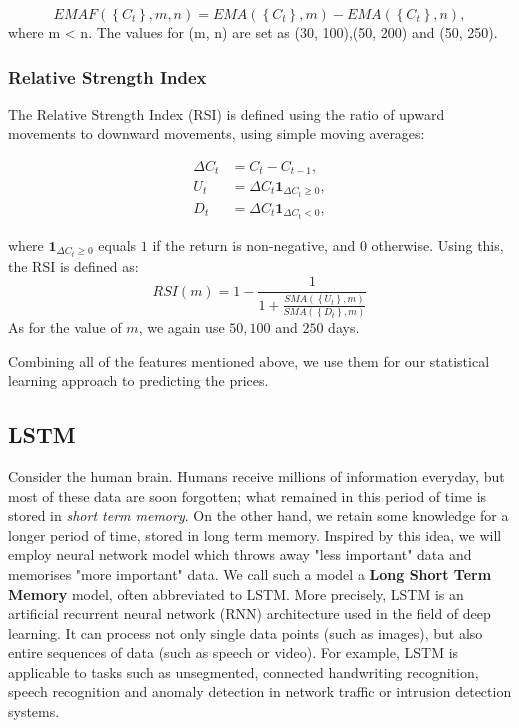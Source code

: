 \documentclass[twoside]{report}
\begin{document}
\begin{spacing}{1}
\[
E M A F\left(\left\{C_{t}\right\}, m, n\right)=E M A\left(\left\{C_{t}\right\}, m\right)-E M A\left(\left\{C_{t}\right\}, n\right),
\]
where m < n. The values for (m, n) are set as (30, 100),(50, 200) and (50, 250).


\subsubsection{Relative Strength Index}
The Relative Strength Index (RSI) is defined using the ratio of upward movements to downward movements, using simple moving averages:

\[
\begin{aligned}
\Delta C_{t} &=C_{t}-C_{t-1}, \\
U_{t} &=\Delta C_{t} \mathbf{1}_{\Delta C_{t} \geq 0}, \\
D_{t} &=\Delta C_{t} \mathbf{1}_{\Delta C_{t}<0},
\end{aligned}
\]

where $\mathbf{1}_{\Delta C_{t} \geq 0}$ equals $1$ if the return is non-negative, and $0$ otherwise. Using this, the RSI is defined as:
\[
R S I(m)=1-\frac{1}{1+\frac{S M A\left(\left\{U_{t}\right\}, m\right)}{S M A\left(\left\{D_{t}\right\}, m\right)}}
\]
As for the value of $m$, we again use $50, 100$ and $250$ days.

Combining all of the features mentioned above, we use them for our statistical learning approach to predicting the prices. 

\subsection{LSTM}

Consider the human brain. Humans receive millions of information everyday, but most of these data are soon forgotten; what remained in this period of time is stored in \textit{short term memory}. On the other hand, we retain some knowledge for a longer period of time, stored in long term memory. Inspired by this idea, we will employ neural network model which throws away "less important" data and memorises "more important" data. We call such a model a \textbf{Long Short Term Memory} model, often abbreviated to LSTM.
More precisely, LSTM is an artificial recurrent neural network (RNN) architecture used in the field of deep learning. It can process not only single data points (such as images), but also entire sequences of data (such as speech or video). For example, LSTM is applicable to tasks such as unsegmented, connected handwriting recognition, speech recognition and anomaly detection in network traffic or intrusion detection systems.\cite{greff2016lstm}


\end{spacing}
\end{document}
